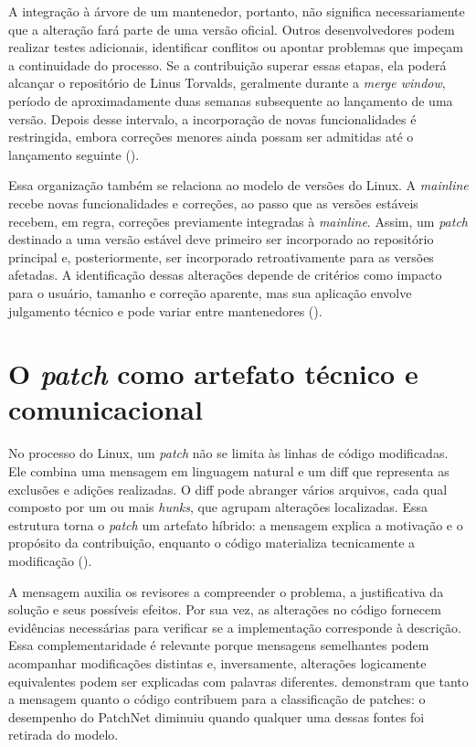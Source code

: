 A integração à árvore de um mantenedor, portanto, não significa necessariamente que a alteração fará parte de uma versão oficial. Outros desenvolvedores podem realizar testes adicionais, identificar conflitos ou apontar problemas que impeçam a continuidade do processo. Se a contribuição superar essas etapas, ela poderá alcançar o repositório de Linus Torvalds, geralmente durante a \textit{merge window}, período de aproximadamente duas semanas subsequente ao lançamento de uma versão. Depois desse intervalo, a incorporação de novas funcionalidades é restringida, embora correções menores ainda possam ser admitidas até o lançamento seguinte (\cite{jiang2013patch}). 

Essa organização também se relaciona ao modelo de versões do Linux. A \textit{mainline} recebe novas funcionalidades e correções, ao passo que as versões estáveis recebem, em regra, correções previamente integradas à \textit{mainline}. Assim, um \textit{patch} destinado a uma versão estável deve primeiro ser incorporado ao repositório principal e, posteriormente, ser incorporado retroativamente para as versões afetadas. A identificação dessas alterações depende de critérios como impacto para o usuário, tamanho e correção aparente, mas sua aplicação envolve julgamento técnico e pode variar entre mantenedores (\cite{hoang2021patchnet}).

\section{O \textit{patch} como artefato técnico e comunicacional}

No processo do Linux, um \textit{patch} não se limita às linhas de código modificadas. Ele combina uma mensagem em linguagem natural e um diff que representa as exclusões e adições realizadas. O diff pode abranger vários arquivos, cada qual composto por um ou mais \textit{hunks}, que agrupam alterações localizadas. Essa estrutura torna o \textit{patch} um artefato híbrido: a mensagem explica a motivação e o propósito da contribuição, enquanto o código materializa tecnicamente a modificação (\cite{hoang2021patchnet}). 

A mensagem auxilia os revisores a compreender o problema, a justificativa da solução e seus possíveis efeitos. Por sua vez, as alterações no código fornecem evidências necessárias para verificar se a implementação corresponde à descrição. Essa complementaridade é relevante porque mensagens semelhantes podem acompanhar modificações distintas e, inversamente, alterações logicamente equivalentes podem ser explicadas com palavras diferentes. \cite{hoang2021patchnet} demonstram que tanto a mensagem quanto o código contribuem para a classificação de patches: o desempenho do PatchNet diminuiu quando qualquer uma dessas fontes foi retirada do modelo. 

